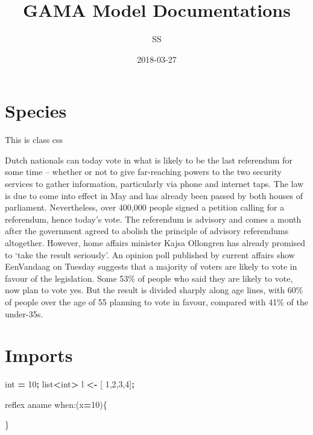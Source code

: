 \documentclass[]{book}
\title{GAMA Model Documentations}
\author{SS}
\date{2018-03-27}
\newenvironment{Shaded}{\begin{snugshade}}{\end{snugshade}}
\newcommand{\BuiltInTok}[1]{#1}
\newcommand{\DecValTok}[1]{\textcolor[rgb]{0.00,0.00,0.81}{#1}}
\newcommand{\NormalTok}[1]{#1}
\newcommand{\OperatorTok}[1]{\textcolor[rgb]{0.81,0.36,0.00}{\textbf{#1}}}
\begin{document}
\maketitle

{
\setcounter{tocdepth}{1}
\tableofcontents
}
\hypertarget{species}{%
\chapter{Species}\label{species}}

 This is class css

Dutch nationals can today vote in what is likely to be the last
referendum for some time -- whether or not to give far-reaching powers
to the two security services to gather information, particularly via
phone and internet taps. The law is due to come into effect in May and
has already been passed by both houses of parliament. Nevertheless, over
400,000 people signed a petition calling for a referendum, hence today's
vote. The referendum is advisory and comes a month after the government
agreed to abolish the principle of advisory referendums altogether.
However, home affairs minister Kajsa Ollongren has already promised to
`take the result seriously'. An opinion poll published by current
affairs show EenVandaag on Tuesday suggests that a majority of voters
are likely to vote in favour of the legislation. Some 53\% of people who
said they are likely to vote, now plan to vote yes. But the result is
divided sharply along age lines, with 60\% of people over the age of 55
planning to vote in favour, compared with 41\% of the under-35s.

\hypertarget{imports}{%
\chapter{Imports}\label{imports}}

\begin{Shaded}
\begin{Highlighting}[]
\BuiltInTok{int} \OperatorTok{=} \DecValTok{10}\OperatorTok{;}
\BuiltInTok{list}\OperatorTok{<}\BuiltInTok{int}\OperatorTok{>}\NormalTok{ l }\OperatorTok{<-}\NormalTok{ [ }\DecValTok{1}\NormalTok{,}\DecValTok{2}\NormalTok{,}\DecValTok{3}\NormalTok{,}\DecValTok{4}\NormalTok{]}\OperatorTok{;}

\NormalTok{reflex aname when:(x}\OperatorTok{=}\DecValTok{10}\NormalTok{)\{}

\NormalTok{\}}
\end{Highlighting}
\end{Shaded}
\end{document}
